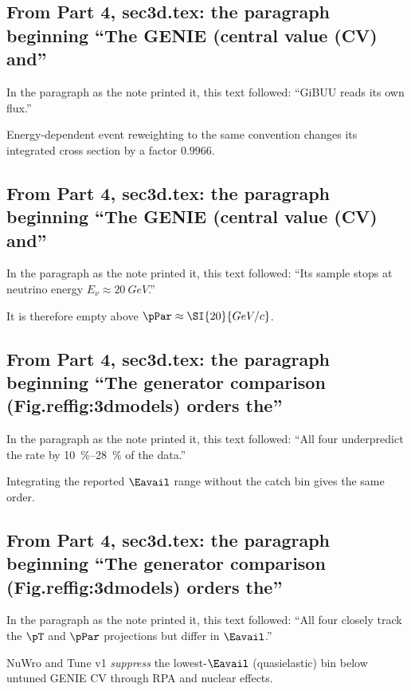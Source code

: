 \subsection{From Part 4, sec3d.tex: the paragraph beginning ``The GENIE (central value (CV) and''}
In the paragraph as the note printed it, this text followed: ``GiBUU reads its own flux.''\par
Energy-dependent event reweighting to the same convention changes its integrated cross section by a factor $0.9966$.

\subsection{From Part 4, sec3d.tex: the paragraph beginning ``The GENIE (central value (CV) and''}
In the paragraph as the note printed it, this text followed: ``Its sample stops at neutrino energy $E_\nu\approx\SI{20}{GeV}$.''\par
It is therefore empty above $\pPar\approx\SI{20}{GeV/c}$.

\subsection{From Part 4, sec3d.tex: the paragraph beginning ``The generator comparison (Fig.reffig:3dmodels) orders the''}
In the paragraph as the note printed it, this text followed: ``All four underpredict the rate by \SIrange{10}{28}{\percent} of the data.''\par
Integrating the reported $\Eavail$ range without the catch bin gives the same order.

\subsection{From Part 4, sec3d.tex: the paragraph beginning ``The generator comparison (Fig.reffig:3dmodels) orders the''}
In the paragraph as the note printed it, this text followed: ``All four closely track the $\pT$ and $\pPar$ projections but differ in $\Eavail$.''\par
NuWro and Tune v1 \emph{suppress} the lowest-$\Eavail$ (quasielastic) bin below untuned GENIE CV through RPA and nuclear effects.

